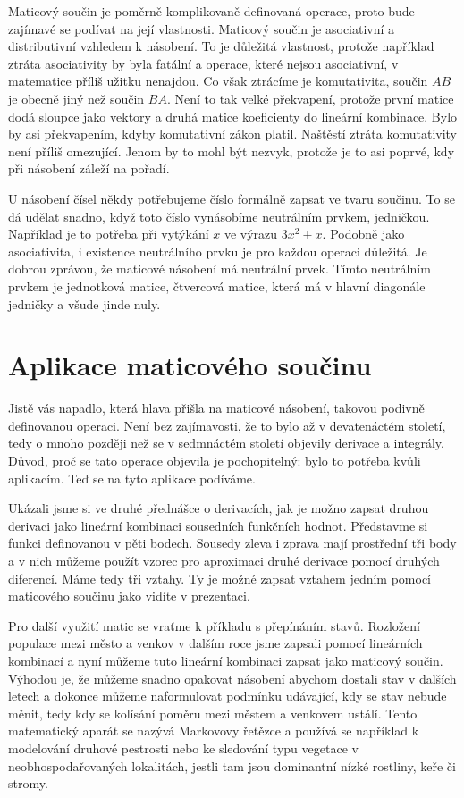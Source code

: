 \documentclass[12pt]{article}
\begin{document}
Maticový součin je poměrně komplikovaně definovaná operace, proto bude zajímavé se podívat na její vlastnosti. Maticový součin je asociativní a distributivní vzhledem k násobení. To je důležitá vlastnost, protože například ztráta asociativity by byla fatální a operace, které nejsou asociativní, v matematice příliš užitku nenajdou. Co však ztrácíme je komutativita, součin $AB$ je obecně jiný než součin $BA$. Není to tak velké překvapení, protože první matice dodá sloupce jako vektory a druhá matice koeficienty do lineární kombinace. Bylo by asi překvapením, kdyby komutativní zákon platil. Naštěstí ztráta komutativity není příliš omezující. Jenom by to mohl být nezvyk, protože je to asi poprvé, kdy při násobení záleží na pořadí.

U násobení čísel někdy potřebujeme číslo formálně zapsat ve tvaru součinu. To se dá udělat snadno, když toto číslo vynásobíme neutrálním prvkem, jedničkou. Například je to potřeba při vytýkání $x$ ve výrazu $3x^2+x$. Podobně jako asociativita, i existence neutrálního prvku je pro každou operaci důležitá. Je dobrou zprávou, že maticové násobení má neutrální prvek. Tímto neutrálním prvkem je jednotková matice, čtvercová matice, která má v hlavní diagonále jedničky a všude jinde nuly. 


\section{Aplikace maticového součinu}

Jistě vás napadlo, která hlava přišla na maticové násobení, takovou podivně definovanou operaci. Není bez zajímavosti, že to bylo až v devatenáctém století, tedy o mnoho později než se v sedmnáctém století objevily derivace a integrály. Důvod, proč se tato operace objevila je pochopitelný: bylo to potřeba kvůli aplikacím. Teď se na tyto aplikace podíváme.

Ukázali jsme si ve druhé přednášce o derivacích, jak je možno zapsat druhou derivaci jako lineární kombinaci sousedních funkčních hodnot. Představme si funkci definovanou v pěti bodech. Sousedy zleva i zprava mají prostřední tři body a v nich můžeme použít vzorec pro aproximaci druhé derivace pomocí druhých diferencí. Máme tedy tři vztahy. Ty je možné zapsat vztahem jedním pomocí maticového součinu jako vidíte v prezentaci.

Pro další využití matic se vraťme k příkladu s přepínáním stavů. Rozložení populace mezi město a venkov v dalším roce jsme zapsali pomocí lineárních kombinací a nyní můžeme tuto lineární kombinaci zapsat jako maticový součin. Výhodou je, že můžeme snadno opakovat násobení abychom dostali stav v dalších letech a dokonce můžeme naformulovat podmínku udávající, kdy se stav nebude měnit, tedy kdy se kolísání poměru mezi městem a venkovem ustálí. Tento matematický aparát se nazývá Markovovy řetězce a používá se například k modelování druhové pestrosti nebo ke sledování typu vegetace v neobhospodařovaných lokalitách, jestli tam jsou dominantní nízké rostliny, keře či stromy.
\end{document}
